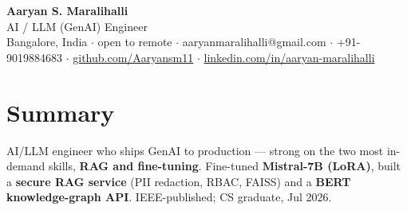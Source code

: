 \documentclass[10pt,a4paper]{article}
\begin{document}
\vspace*{-1cm}
\begin{center}
{\LARGE\bfseries Aaryan S. Maralihalli}\\[0.5em]
{\large AI / LLM (GenAI) Engineer}\\[0.3em]
Bangalore, India $\cdot$ open to remote $\cdot$ aaryanmaralihalli@gmail.com $\cdot$ +91-9019884683 $\cdot$ \href{https://github.com/Aaryansm11}{github.com/Aaryansm11} $\cdot$ \href{https://linkedin.com/in/aaryan-maralihalli}{linkedin.com/in/aaryan-maralihalli}
\end{center}\vspace{0.4ex}
\section*{Summary}
AI/LLM engineer who ships GenAI to production --- strong on the two most in-demand skills, \textbf{RAG and fine-tuning}. Fine-tuned \textbf{Mistral-7B (LoRA)}, built a \textbf{secure RAG service} (PII redaction, RBAC, FAISS) and a \textbf{BERT knowledge-graph API}. IEEE-published; CS graduate, Jul 2026.\par\vspace{2pt}
\end{document}
